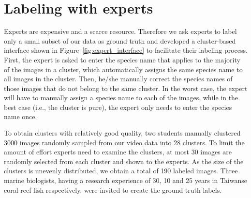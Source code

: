 \section{Labeling with experts}
\label{sec:expt_label}

Experts are expensive and a scarce resource.
Therefore we ask experts to label only a small subset of our data
as ground truth and developed a cluster-based interface shown in 
Figure~\ref{fig:expert_interface} to facilitate their labeling process. 
%
First, the expert is asked to enter the species name that
applies to the majority of the images in a cluster, which automatically assigns the same 
species name to all images in the cluster.
Then, he/she manually correct the species names of those images that
do not belong to the same cluster.
%
%
%
In the worst case, the expert will have to manually assign a species name to each of the images, 
while in the best case (i.e., the cluster is pure), the expert only needs to enter the species name once.
%

To obtain clusters with relatively good quality, two students manually clustered 
3000 images randomly sampled from our video data into 28 clusters.
%
To limit the amount of effort experts need to examine the clusters, at
most 30 images are randomly selected from each cluster and shown to
the experts. As the size of the clusters is unevenly distributed,
we obtain a total of 190 labeled images.
%
Three marine biologists, %
having a research experience
of 30, 10 and 25 years in Taiwanse coral reef fish respectively, were invited 
to create the ground truth labels. 

